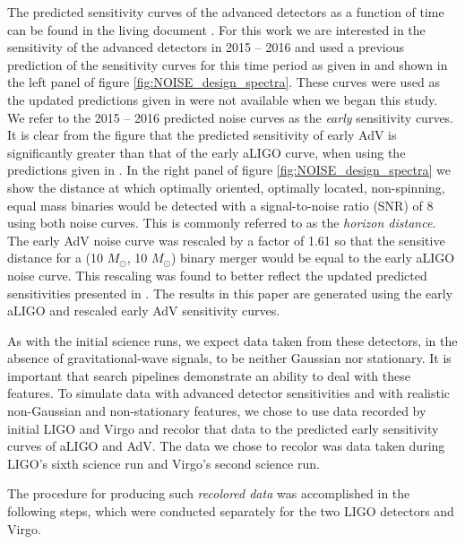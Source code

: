 \documentclass[12pt]{iopart}
\begin{document}
The predicted sensitivity curves of the advanced detectors as a function of
time can be found in the living document
\cite{Aasi:2013wya}. For this work we are interested in the
sensitivity of the advanced detectors in 2015 -- 2016 and used a previous 
prediction of the sensitivity curves for this time period as given in
\cite{LV_early_noisecurves} and shown in the left panel of figure 
\ref{fig:NOISE_design_spectra}.
These curves were used as the updated predictions given in 
\cite{Aasi:2013wya} were not available when we began this study.
We refer to the 2015 -- 2016 predicted noise curves as the \emph{early} 
sensitivity curves.
It is clear from the figure that the predicted
sensitivity of early AdV is significantly greater than 
that of the early aLIGO curve, when using the predictions given in 
\cite{LV_early_noisecurves}. In the right panel of figure 
\ref{fig:NOISE_design_spectra} we
show the distance at which optimally oriented, optimally located,
non-spinning, equal mass binaries would be detected with a
signal-to-noise ratio (SNR) of 8 using both noise curves.
This is commonly referred to as the \emph{horizon distance}. The early AdV 
noise curve was rescaled
by a factor of 1.61 so that the sensitive distance for a
(10 $M_{\odot}$, 10 $M_{\odot}$) binary merger would be equal to the early aLIGO
noise curve. This rescaling was found to better reflect the updated predicted
sensitivities presented in \cite{Aasi:2013wya}. The results in this 
paper are generated using the early aLIGO and rescaled early AdV sensitivity 
curves.

As with the initial science runs, we expect data taken from
these detectors, in the absence of gravitational-wave signals, to be neither
Gaussian nor stationary. It is important that search pipelines demonstrate
an ability to deal with these features. To simulate data with 
advanced detector sensitivities and with
realistic non-Gaussian and non-stationary features, we chose to use
data recorded by initial LIGO and Virgo and recolor that data to the
predicted early sensitivity curves of aLIGO and AdV. The data we
chose to recolor was data taken during LIGO's sixth science run and Virgo's
second science run.

The procedure for producing such \emph{recolored data} was accomplished in the
following steps, which were conducted separately for the two LIGO detectors and
Virgo.
\end{document}
